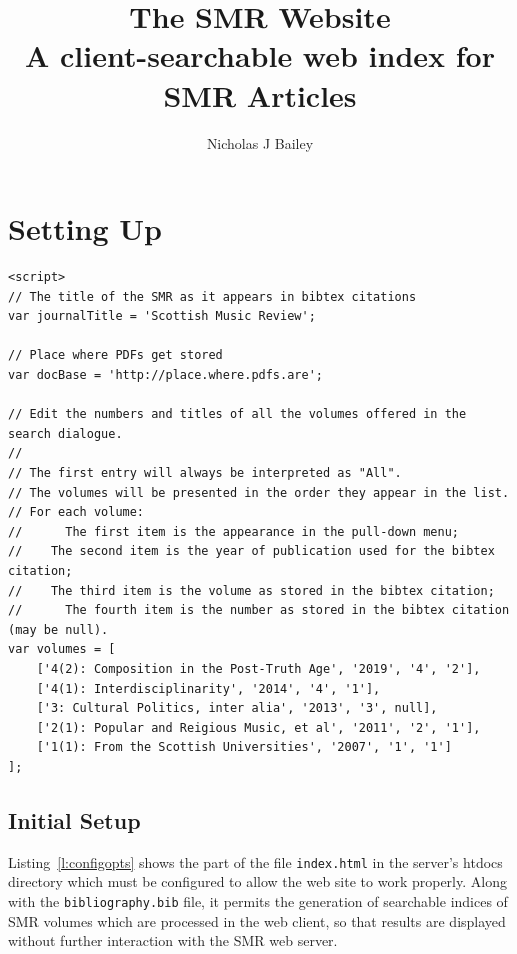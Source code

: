 \documentclass[a4paper,10pt]{SMR}
\title{The SMR Website\\A client-searchable web index for SMR Articles}
\author{Nicholas J Bailey}
\begin{document}
\maketitle

% 

\section{Setting Up}
\begin{lstlisting}
<script>
// The title of the SMR as it appears in bibtex citations
var journalTitle = 'Scottish Music Review';

// Place where PDFs get stored
var docBase = 'http://place.where.pdfs.are';

// Edit the numbers and titles of all the volumes offered in the search dialogue.
//
// The first entry will always be interpreted as "All".
// The volumes will be presented in the order they appear in the list.
// For each volume:
//		The first item is the appearance in the pull-down menu;
//    The second item is the year of publication used for the bibtex citation;
//    The third item is the volume as stored in the bibtex citation;
//		The fourth item is the number as stored in the bibtex citation (may be null).
var volumes = [
	['4(2): Composition in the Post-Truth Age', '2019', '4', '2'],
	['4(1): Interdisciplinarity', '2014', '4', '1'],
	['3: Cultural Politics, inter alia', '2013', '3', null],
	['2(1): Popular and Reigious Music, et al', '2011', '2', '1'],
	['1(1): From the Scottish Universities', '2007', '1', '1']
]; 

\end{lstlisting}

\subsection{Initial Setup}
\label{s:setup}

Listing~\ref{l:configopts} shows the part of the file \texttt{index.html}
in the server's htdocs directory which must be configured to allow the web
site to work properly. Along with the \texttt{bibliography.bib} file, it
permits the generation of searchable indices of SMR volumes which are
processed in the web client, so that results are displayed without further
interaction with the SMR web server.
\end{document}
